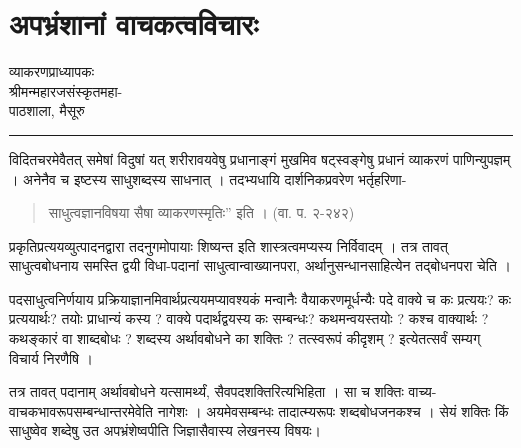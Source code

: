 \chapter{अपभ्रंशानां वाचकत्वविचारः}

\begin{center}
\smallskip

व्याकरणप्राध्यापकः\\
श्रीमन्महारजसंस्कृतमहा-\\
पाठशाला, मैसूरु
\rule{\textwidth}{0.1pt}
\end{center}

विदितचरमेवैतत् समेषां विदुषां यत् शरीरावयवेषु प्रधानाङ्गं मुखमिव षट्स्वङ्गेषु प्रधानं व्याकरणं पाणिन्युपज्ञम् । अनेनैव च इष्टस्य साधुशब्दस्य साधनात् । तदभ्यधायि दार्शनिकप्रवरेण भर्तृहरिणा-
\begin{verse}
साधुत्वज्ञानविषया सैषा व्याकरणस्मृतिः” इति । (वा. प. २-२४२)
\end{verse}
प्रकृतिप्रत्ययव्युत्पादनद्वारा तदनुगमोपायाः शिष्यन्त इति शास्त्रत्वमप्यस्य निर्विवादम् । तत्र तावत् साधुत्वबोधनाय समस्ति द्वयी विधा-पदानां साधुत्वान्वाख्यानपरा, अर्थानुसन्धानसाहित्येन तद्बोधनपरा चेति । 

पदसाधुत्वनिर्णयाय प्रक्रियाज्ञानमिवार्थप्रत्ययमप्यावश्यकं मन्वानैः वैयाकरणमूर्धन्यैः पदे वाक्ये च कः प्रत्ययः? कः प्रत्ययार्थः? तयोः प्राधान्यं कस्य ? वाक्ये पदार्थद्वयस्य कः सम्बन्धः? कथमन्वयस्तयोः ? कश्च वाक्यार्थः ? कथङ्कारं वा शाब्दबोधः ? शब्दस्य अर्थावबोधने का शक्तिः ? तत्स्वरूपं कीदृशम् ? इत्येतत्सर्वं सम्यग् विचार्य निरणैषि ।  

तत्र तावत् पदानाम् अर्थावबोधने यत्सामर्थ्यं, सैवपदशक्तिरित्यभिहिता । सा च शक्तिः वाच्य-वाचकभावरूपसम्बन्धान्तरमेवेति नागेशः । अयमेवसम्बन्धः तादात्म्यरूपः शब्दबोधजनकश्च । सेयं शक्तिः किं साधुष्वेव शब्देषु उत अपभ्रंशेष्वपीति जिज्ञासैवास्य लेखनस्य विषयः।


